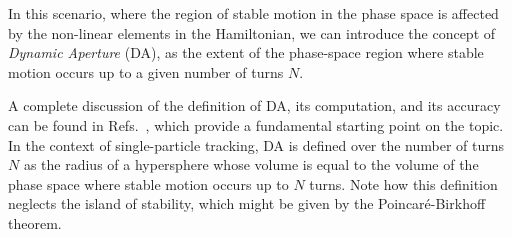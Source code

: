 In this scenario, where the region of stable motion in the phase space is affected by the non-linear elements in the Hamiltonian, we can introduce the concept of \textit{Dynamic Aperture} (DA), as the extent of the phase-space region where stable motion occurs up to a given number of turns $N$.

A complete discussion of the definition of DA, its computation, and its accuracy can be found in Refs.~\cite{PhysRevE.53.4067, invlog}, which provide a fundamental starting point on the topic. In the context of single-particle tracking, DA is defined over the number of turns $N$ as the radius of a hypersphere whose volume is equal to the volume of the phase space where stable motion occurs up to $N$ turns. Note how this definition neglects the island of stability, which might be given by the Poincaré-Birkhoff theorem.

